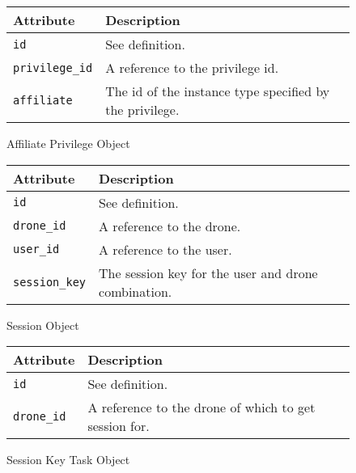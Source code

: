 \begin{figure}[htb]
\begin{center}
\begin{tabular}{ | l | p{8cm} | }
  \hline
    \textbf{Attribute} & \textbf{Description} \\ \hline
    \verb+id+ & See definition.\\ \hline
    \verb+privilege_id+ & A reference to the privilege id.\\ \hline
    \verb+affiliate+ & The id of the instance type specified by the privilege.\\ \hline
\end{tabular}
\caption{Affiliate Privilege Object}
\label{tab:affiliate_privilege_object}
\end{center}
\end{figure}

\begin{figure}[htb]
\begin{center}
\begin{tabular}{ | l | p{8cm} | }
  \hline
    \textbf{Attribute} & \textbf{Description} \\ \hline
    \verb+id+ & See definition.\\ \hline
    \verb+drone_id+ & A reference to the drone.\\ \hline
    \verb+user_id+ & A reference to the user.\\ \hline
    \verb+session_key+ & The session key for the user and drone combination.\\ \hline
\end{tabular}
\caption{Session Object}
\label{tab:session_object}
\end{center}
\end{figure}

\begin{figure}[htb]
\begin{center}
\begin{tabular}{ | l | p{8cm} | }
  \hline
    \textbf{Attribute} & \textbf{Description} \\ \hline
    \verb+id+ & See definition.\\ \hline
    \verb+drone_id+ & A reference to the drone of which to get session for.\\ \hline
\end{tabular}
\caption{Session Key Task Object}
\label{tab:session_key_task_object}
\end{center}
\end{figure}

